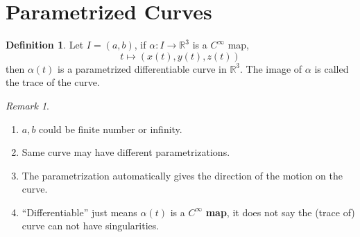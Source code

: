 \documentclass[UTF8,oneside,11pt]{book}
\theoremstyle{plain}\newtheorem{thm}{Theorem}
\theoremstyle{definition}\newtheorem{defn}[thm]{Definition}
\theoremstyle{plain}\newtheorem{axiom}[thm]{Axiom}
\theoremstyle{plain}\newtheorem{coro}[thm]{Corollary}
\theoremstyle{plain}\newtheorem{lemma}[thm]{Lemma}
\theoremstyle{plain}\newtheorem{prop}[thm]{Proposition}
\theoremstyle{plain}\newtheorem{conj}[thm]{Conjecture}
\theoremstyle{plain}\newtheorem{ques}[thm]{Problem}
\theoremstyle{plain}\newtheorem{const}[thm]{Construction}
\theoremstyle{remark}\newtheorem{notation}[thm]{Notation}
\theoremstyle{plain}\newtheorem*{app}{Application}
\theoremstyle{plain}\newtheorem*{exam}{Example}
\theoremstyle{plain}\newtheorem*{exer}{Exercise}
\theoremstyle{remark}\newtheorem*{remark}{Remark}
\theoremstyle{remark}\newtheorem*{note}{\small{Note}}
\numberwithin{equation}{section}
\numberwithin{thm}{section}
\begin{document}
\section{Parametrized Curves}
\begin{defn}
    Let $I=(a,b)$, if $\alpha\colon I\to \mathbb{R}^3$ is a $C^\infty$ map,
    \[t \mapsto (x(t),y(t),z(t))\]
    then $\alpha(t)$ is a parametrized differentiable curve in $\mathbb{R}^3$. The image of $\alpha$ is called the trace of the curve. 
\end{defn}
\begin{remark}
    \hfill
    \begin{enumerate}[1)]
        \item $a,b$ could be finite number or infinity.
        \item Same curve may have different parametrizations.
        \item The parametrization automatically gives the direction of the motion on the curve.
        \item ``Differentiable'' just means $\alpha(t)$ is a $C^\infty$ \textbf{map}, it does not say the (trace of) curve can not have singularities.
    \end{enumerate}
\end{remark}
\end{document}

